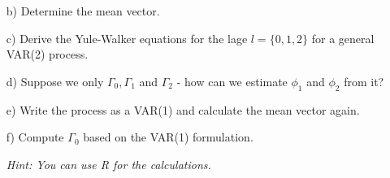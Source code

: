 \documentclass[12pt,a4paper]{article}
\begin{document}
\begin{itemize}
    \item[b)] Determine the mean vector.
    \item[c)] Derive the Yule-Walker equations for the lage $l = \{0,1,2 \}$ for a general VAR(2) process.
    \item[d)] Suppose we only $\Gamma_0 , \Gamma_1$ and $\Gamma_2$ - how can we estimate $\phi_1$ and $\phi_2$ from it?
    \item[e)] Write the process as a VAR(1) and calculate the mean vector again.
    \item[f)] Compute $\Gamma_0$ based on the VAR(1) formulation.
    \item[] \textit{Hint: You can use R for the calculations.}
\end{itemize}
\end{document}
